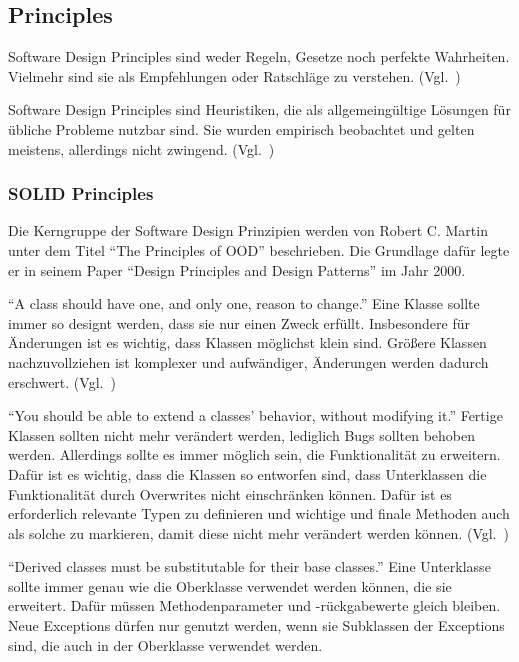\subsection{Principles}
Software Design Principles sind weder Regeln, Gesetze noch perfekte Wahrheiten.
Vielmehr sind sie als Empfehlungen oder Ratschläge zu verstehen.
(Vgl.~\cite{getting-a-solid-start})

Software Design Principles sind Heuristiken, die als allgemeingültige Lösungen für übliche Probleme nutzbar sind.
Sie wurden empirisch beobachtet und gelten meistens, allerdings nicht zwingend.
(Vgl.~\cite{getting-a-solid-start})

\subsubsection{SOLID Principles}
Die Kerngruppe der Software Design Prinzipien werden von Robert C. Martin unter dem Titel \enquote{The Principles of OOD}\cite{solid} beschrieben.
Die Grundlage dafür legte er in seinem Paper \enquote{Design Principles and Design Patterns}\cite{design-principles-and-design-patterns} im Jahr 2000.

\enquote{A class should have one, and only one, reason to change.}\cite{solid}
Eine Klasse sollte immer so designt werden, dass sie nur einen Zweck erfüllt\cite{different-types-of-software-design-principles}.
Insbesondere für Änderungen ist es wichtig, dass Klassen möglichst klein sind.
Größere Klassen nachzuvollziehen ist komplexer und aufwändiger, Änderungen werden dadurch erschwert.
(Vgl.~\cite{clean-code})

\enquote{You should be able to extend a classes' behavior, without modifying it.}\cite{solid}
Fertige Klassen sollten nicht mehr verändert werden, lediglich Bugs sollten behoben werden.
Allerdings sollte es immer möglich sein, die Funktionalität zu erweitern.
Dafür ist es wichtig, dass die Klassen so entworfen sind, dass Unterklassen die Funktionalität durch Overwrites nicht einschränken können.
Dafür ist es erforderlich relevante Typen zu definieren und wichtige und finale Methoden auch als solche zu markieren, damit diese nicht mehr verändert werden können.
(Vgl.~\cite{different-types-of-software-design-principles})

\newpage

\enquote{Derived classes must be substitutable for their base classes.}\cite{solid}
Eine Unterklasse sollte immer genau wie die Oberklasse verwendet werden können, die sie erweitert\cite{different-types-of-software-design-principles}.
Dafür müssen Methodenparameter und -rückgabewerte gleich bleiben.
Neue Exceptions dürfen nur genutzt werden, wenn sie Subklassen der Exceptions sind, die auch in der Oberklasse verwendet werden.

